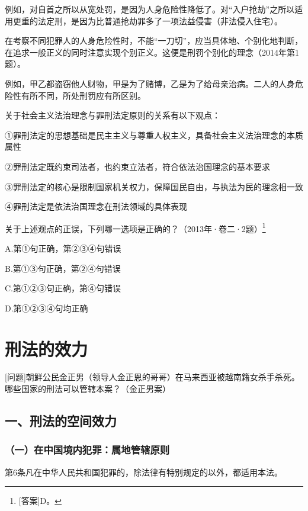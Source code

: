 
例如，对自首之所以从宽处罚，是因为人身危险性降低了。对“入户抢劫”之所以适用更重的法定刑，是因为比普通抢劫罪多了一项法益侵害（非法侵入住宅）。

在考察不同犯罪人的人身危险性时，不能“一刀切”，应当具体地、个别化地判断，在追求一般正义的同时注意实现个别正义。这便是刑罚个别化的理念（2014年第1题）。

例如，甲乙都盗窃他人财物，甲是为了赌博，乙是为了给母亲治病。二人的人身危险性有所不同，所处刑罚应有所区别。


关于社会主义法治理念与罪刑法定原则的关系有以下观点：

①罪刑法定的思想基础是民主主义与尊重人权主义，具备社会主义法治理念的本质属性

②罪刑法定既约束司法者，也约束立法者，符合依法治国理念的基本要求

③罪刑法定的核心是限制国家机关权力，保障国民自由，与执法为民的理念相一致

④罪刑法定是依法治国理念在刑法领域的具体表现

关于上述观点的正误，下列哪一选项是正确的？（2013年·卷二·2题）\footnote{[答案]D。}

A.第①句正确，第②③④句错误

B.第①③句正确，第②④句错误

C.第①②③句正确，第④句错误

D.第①②③④句均正确

\section{刑法的效力}

[问题]朝鲜公民金正男（领导人金正恩的哥哥）在马来西亚被越南籍女杀手杀死。哪些国家的刑法可以管辖本案？（金正男案）

\subsection*{一、刑法的空间效力}

\subsubsection*{（一）在中国境内犯罪：属地管辖原则}

第6条凡在中华人民共和国犯罪的，除法律有特别规定的以外，都适用本法。

